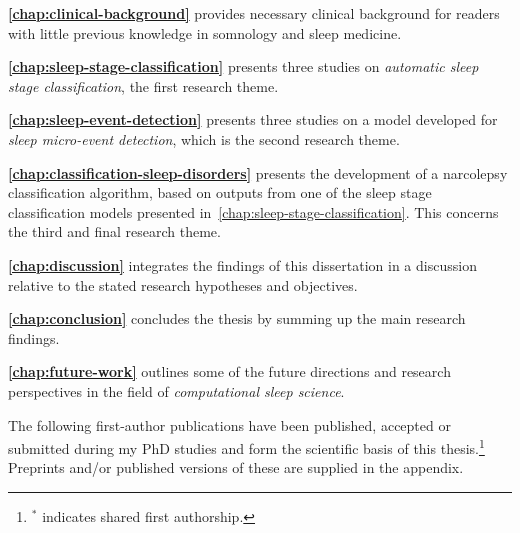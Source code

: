 \textbf{\cref{chap:clinical-background}} provides necessary clinical background for readers with little previous knowledge in somnology and sleep medicine.
    
\textbf{\cref{chap:sleep-stage-classification}} presents three studies on \emph{automatic sleep stage classification}, the first research theme.

\textbf{\cref{chap:sleep-event-detection}} presents three studies on a model developed for \emph{sleep micro-event detection}, which is the second research theme.

\textbf{\cref{chap:classification-sleep-disorders}} presents the development of a narcolepsy classification algorithm, based on outputs from one of the sleep stage classification models presented in~\cref{chap:sleep-stage-classification}. This concerns the third and final research theme.

\textbf{\cref{chap:discussion}} integrates the findings of this dissertation in a discussion relative to the stated research hypotheses and objectives.

\textbf{\cref{chap:conclusion}} concludes the thesis by summing up the main research findings.

\textbf{\cref{chap:future-work}} outlines some of the future directions and research perspectives in the field of \emph{computational sleep science}.

\bigskip

The following first-author publications have been published, accepted or submitted during my PhD studies and form the scientific basis of this thesis.\footnote{\(^{\ast}\) indicates shared first authorship.} Preprints and/or published versions of these are supplied in the appendix.
    
